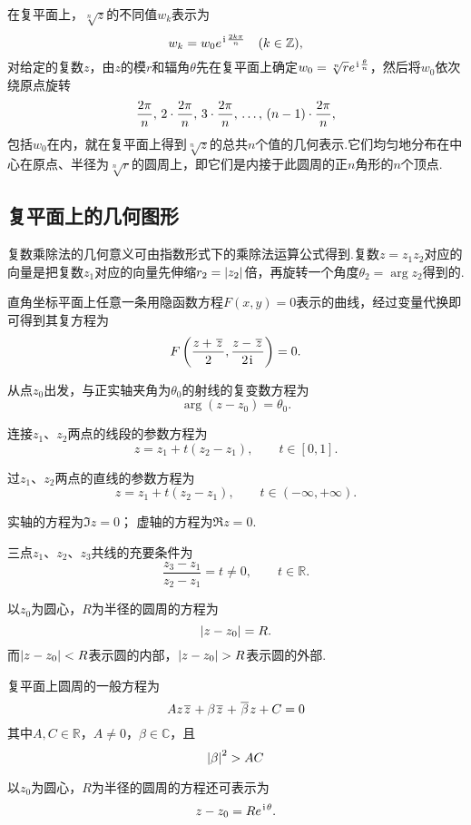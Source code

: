 在复平面上，\(\sqrt[n]{z}\)的不同值\(w_k\)表示为\[
w_k = w_0 e^{\kern1pt\mathrm{i}\kern1pt\frac{2k\pi}{n}} \quad (k \in \mathbb{Z}),
\]对给定的复数\(z\)，由\(z\)的模\(r\)和辐角\(\theta\)先在复平面上确定\(w_0 = \sqrt[n]{r} e^{\kern1pt\mathrm{i}\kern1pt\frac{\theta}{n}}\)，然后将\(w_0\)依次绕原点旋转\[
\def\f{\frac{2\pi}{n}}
\f,\,2\cdot\f,\,3\cdot\f,\,\dots,\,(n-1)\cdot\f,
\]包括\(w_0\)在内，就在复平面上得到\(\sqrt[n]{z}\)的总共\(n\)个值的几何表示.它们均匀地分布在中心在原点、半径为\(\sqrt[n]{r}\)的圆周上，即它们是内接于此圆周的正\(n\)角形的\(n\)个顶点.

\subsection{复平面上的几何图形}
复数乘除法的几何意义可由指数形式下的乘除法运算公式得到.复数\(z=z_1 z_2\)对应的向量是把复数\(z_1\)对应的向量先伸缩\(r_2 = \abs{z_2}\)倍，再旋转一个角度\(\theta_2 = \arg z_2\)得到的.

直角坐标平面上任意一条用隐函数方程\(F(x,y)=0\)表示的曲线，经过变量代换即可得到其复方程为\[
F\left(\frac{z+\kern1pt\overline{z}\kern1pt}{2},\frac{z-\kern1pt\overline{z}\kern1pt}{2\kern1pt\mathrm{i}\kern1pt}\right)=0.
\]

\begin{example}[射线]
从点\(z_0\)出发，与正实轴夹角为\(\theta_0\)的射线的复变数方程为\[
\arg(z-z_0) = \theta_0.
\]
\end{example}

\begin{example}[线段]
连接\(z_1\)、\(z_2\)两点的线段的参数方程为\[
z = z_1 + t(z_2 - z_1), \qquad t \in [0,1].
\]
\end{example}

\begin{example}[直线]
过\(z_1\)、\(z_2\)两点的直线的参数方程为\[
z = z_1 + t(z_2 - z_1), \qquad t \in (-\infty,+\infty).
\]

实轴的方程为\(\Im z = 0\)；
虚轴的方程为\(\Re z = 0\).
\end{example}

\begin{example}[三点共线的充要条件]
三点\(z_1\)、\(z_2\)、\(z_3\)共线的充要条件为\[
\frac{z_3 - z_1}{z_2 - z_1} = t \neq 0, \qquad t \in \mathbb{R}.
\]
\end{example}

\begin{example}[圆]
以\(z_0\)为圆心，\(R\)为半径的圆周的方程为\[
\abs{z - z_0} = R.
\]而\(\abs{z-z_0}<R\)表示圆的内部，\(\abs{z-z_0}>R\)表示圆的外部.

复平面上圆周的一般方程为\[
A z \kern1pt\overline{z}\kern1pt + \beta \kern1pt\overline{z}\kern1pt + \kern1pt\overline{\beta}\kern1pt z + C = 0
\]其中\(A,C\in\mathbb{R}\)，\(A \neq 0\)，\(\beta\in\mathbb{C}\)，且\[
\abs{\beta}^2 > AC
\]

以\(z_0\)为圆心，\(R\)为半径的圆周的方程还可表示为\[
z - z_0 = R e^{\kern1pt\mathrm{i}\kern1pt \theta}.
\]
\end{example}

